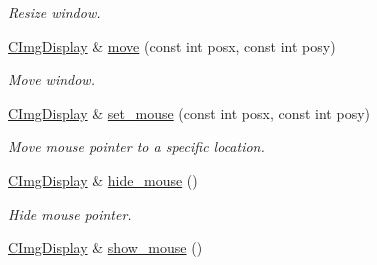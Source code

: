 \begin{DoxyCompactItemize}
\begin{DoxyCompactList}\small\item\em Resize window. \item\end{DoxyCompactList}\item 
\hypertarget{structcimg__library_1_1_c_img_display_afeec07e38bf1bc2257fd15827ef36e4c}{
\hyperlink{structcimg__library_1_1_c_img_display}{CImgDisplay} \& \hyperlink{structcimg__library_1_1_c_img_display_afeec07e38bf1bc2257fd15827ef36e4c}{move} (const int posx, const int posy)}
\label{structcimg__library_1_1_c_img_display_afeec07e38bf1bc2257fd15827ef36e4c}

\begin{DoxyCompactList}\small\item\em Move window. \item\end{DoxyCompactList}\item 
\hypertarget{structcimg__library_1_1_c_img_display_a38a72a55b3d0fb87e11706c018d55569}{
\hyperlink{structcimg__library_1_1_c_img_display}{CImgDisplay} \& \hyperlink{structcimg__library_1_1_c_img_display_a38a72a55b3d0fb87e11706c018d55569}{set\_\-mouse} (const int posx, const int posy)}
\label{structcimg__library_1_1_c_img_display_a38a72a55b3d0fb87e11706c018d55569}

\begin{DoxyCompactList}\small\item\em Move mouse pointer to a specific location. \item\end{DoxyCompactList}\item 
\hypertarget{structcimg__library_1_1_c_img_display_ae6d02e259f8234c2c751430f6b9725ca}{
\hyperlink{structcimg__library_1_1_c_img_display}{CImgDisplay} \& \hyperlink{structcimg__library_1_1_c_img_display_ae6d02e259f8234c2c751430f6b9725ca}{hide\_\-mouse} ()}
\label{structcimg__library_1_1_c_img_display_ae6d02e259f8234c2c751430f6b9725ca}

\begin{DoxyCompactList}\small\item\em Hide mouse pointer. \item\end{DoxyCompactList}\item 
\hypertarget{structcimg__library_1_1_c_img_display_aedefb21bea6e00ccf2d8d8469fa0c7bf}{
\hyperlink{structcimg__library_1_1_c_img_display}{CImgDisplay} \& \hyperlink{structcimg__library_1_1_c_img_display_aedefb21bea6e00ccf2d8d8469fa0c7bf}{show\_\-mouse} ()}
\label{structcimg__library_1_1_c_img_display_aedefb21bea6e00ccf2d8d8469fa0c7bf}


\end{DoxyCompactItemize}
